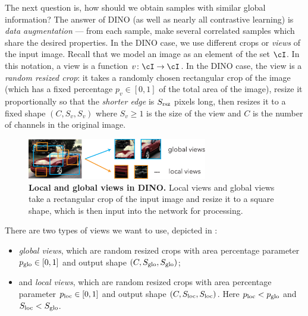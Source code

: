 \documentclass[../../book-main.tex]{subfiles}
\begin{document}
The next question is, how should we obtain samples with similar global information? The answer of DINO (as well as nearly all contrastive learning) is \textit{data augmentation} --- from each sample, make several correlated samples which share the desired properties. In the DINO case, we use different crops or \textit{views} of the input image. Recall that we model an image as an element of the set \(\cI\). In this notation, a view is a function \(v \colon \cI \to \cI\). In the DINO case, the view is a \textit{random resized crop}: it takes a randomly chosen rectangular crop of the image (which has a fixed percentage \(p_{v} \in [0, 1]\) of the total area of the image), resize it proportionally so that the \textit{shorter edge} is \(S_{\mathrm{rsz}}\) pixels long, then resizes it to a fixed shape \((C, S_{v}, S_{v})\) where \(S_{v} \geq 1\) is the size of the view and \(C\) is the number of channels in the original image. 

\begin{figure}
    \centering 
    \includegraphics[width=0.7\textwidth]{chapters/chapter7/figs/global_local_views.pdf}
    \caption{\textbf{Local and global views in DINO.} Local views and global views take a rectangular crop of the input image and resize it to a square shape, which is then input into the network for processing.}
    \label{fig:dino_local_global_views}
\end{figure}

There are two types of views we want to use, depicted in : 
\begin{itemize}
    \item \textit{global views}, which are random resized crops with area percentage parameter \(p_{\mathrm{glo}} \in [0, 1]\) and output shape \((C, S_{\mathrm{glo}}, S_{\mathrm{glo}})\);
    \item and \textit{local views}, which are random resized crops with area percentage parameter \(p_{\mathrm{loc}} \in [0, 1]\) and output shape \((C, S_{\mathrm{loc}}, S_{\mathrm{loc}})\). Here \(p_{\mathrm{loc}} < p_{\mathrm{glo}}\) and \(S_{\mathrm{loc}} < S_{\mathrm{glo}}\).
\end{itemize}
\end{document}

